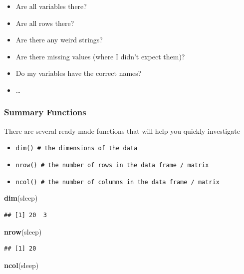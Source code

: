 \documentclass[
]{book}
\newenvironment{Shaded}{\begin{snugshade}}{\end{snugshade}}
\newcommand{\FunctionTok}[1]{\textcolor[rgb]{0.13,0.29,0.53}{\textbf{#1}}}
\newcommand{\NormalTok}[1]{#1}
\begin{document}
\begin{itemize}
\item
  Are all variables there?
\item
  Are all rows there?
\item
  Are there any weird strings?
\item
  Are there missing values (where I didn't expect them)?
\item
  Do my variables have the correct names?
\item
  \ldots{}
\end{itemize}

\subsubsection{Summary Functions}\label{summary-functions}

There are several ready-made functions that will help you quickly investigate

\begin{itemize}
\item
  \texttt{dim()~\#\ the\ dimensions\ of\ the\ data}
\item
  \texttt{nrow()\ \#\ the\ number\ of\ rows\ in\ the\ data\ frame\ /\ matrix}
\item
  \texttt{ncol()\ \#\ the\ number\ of\ columns\ in\ the\ data\ frame\ /\ matrix}
\end{itemize}

\begin{Shaded}
\begin{Highlighting}[]
\FunctionTok{dim}\NormalTok{(sleep)}
\end{Highlighting}
\end{Shaded}

\begin{verbatim}
## [1] 20  3
\end{verbatim}

\begin{Shaded}
\begin{Highlighting}[]
\FunctionTok{nrow}\NormalTok{(sleep)}
\end{Highlighting}
\end{Shaded}

\begin{verbatim}
## [1] 20
\end{verbatim}

\begin{Shaded}
\begin{Highlighting}[]
\FunctionTok{ncol}\NormalTok{(sleep)}
\end{Highlighting}
\end{Shaded}
\end{document}
